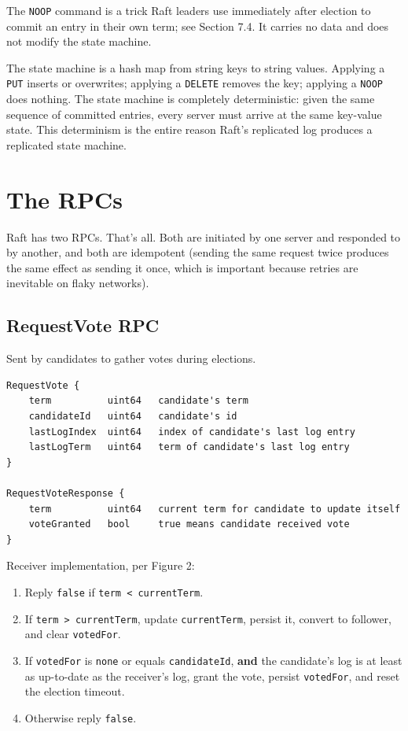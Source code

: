 \documentclass[11pt,a4paper]{article}
\begin{document}
The \texttt{NOOP} command is a trick Raft leaders use immediately after election to commit an entry in their own term; see Section 7.4. It carries no data and does not modify the state machine.

The state machine is a hash map from string keys to string values. Applying a \texttt{PUT} inserts or overwrites; applying a \texttt{DELETE} removes the key; applying a \texttt{NOOP} does nothing. The state machine is completely deterministic: given the same sequence of committed entries, every server must arrive at the same key-value state. This determinism is the entire reason Raft's replicated log produces a replicated state machine.

\section{The RPCs}

Raft has two RPCs. That's all. Both are initiated by one server and responded to by another, and both are idempotent (sending the same request twice produces the same effect as sending it once, which is important because retries are inevitable on flaky networks).

\subsection{RequestVote RPC}
Sent by candidates to gather votes during elections.

\begin{codebox}
\begin{lstlisting}
RequestVote {
    term          uint64   candidate's term
    candidateId   uint64   candidate's id
    lastLogIndex  uint64   index of candidate's last log entry
    lastLogTerm   uint64   term of candidate's last log entry
}

RequestVoteResponse {
    term          uint64   current term for candidate to update itself
    voteGranted   bool     true means candidate received vote
}
\end{lstlisting}
\end{codebox}

Receiver implementation, per Figure 2:

\begin{enumerate}
\item Reply \texttt{false} if \texttt{term < currentTerm}.
\item If \texttt{term > currentTerm}, update \texttt{currentTerm}, persist it, convert to follower, and clear \texttt{votedFor}.
\item If \texttt{votedFor} is \texttt{none} or equals \texttt{candidateId}, \textbf{and} the candidate's log is at least as up-to-date as the receiver's log, grant the vote, persist \texttt{votedFor}, and reset the election timeout.
\item Otherwise reply \texttt{false}.
\end{enumerate}
\end{document}
